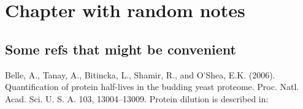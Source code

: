 

\chapter*{Chapter with random notes}


\section{Some refs that might be convenient}



\begin{list}{-}
    \item Belle, A., Tanay, A., Bitincka, L., Shamir, R., and O’Shea, E.K. (2006). Quantification of protein half-lives in the budding yeast proteome. Proc. Natl. Acad. Sci. U. S. A. 103, 13004–13009.
    Protein dilution is described in:
    \cite{Belle2006}
\end{list}